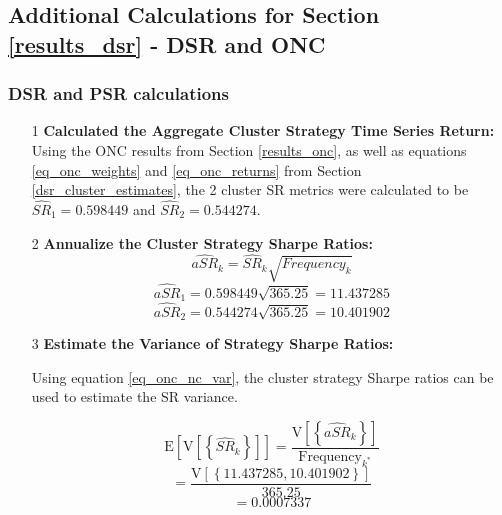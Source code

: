 \documentclass[a4paper,11pt,oneside]{article}
\theoremstyle{plain}
\theoremstyle{definition}
\begin{document}
	
	
	
	
	
	
	
	\subsection{Additional Calculations for Section \ref{results_dsr} - DSR and ONC}\label{results_dsr_appendix}
	
	
	\subsubsection{DSR and PSR calculations}
	
	\begin{itemize}
		\item [1] \textbf{Calculated the Aggregate Cluster Strategy Time Series Return:} \newline
		Using the ONC results from Section \ref{results_onc}, as well as equations \ref{eq_onc_weights} and \ref{eq_onc_returns} from Section \ref{dsr_cluster_estimates}, the 2 cluster SR metrics were calculated to be $\widehat{SR}_{1}={0.598449}$ and 	$\widehat{SR}_{2}={0.544274}$. \newline
		
		\item [2] \textbf{Annualize the Cluster Strategy Sharpe Ratios:} \newline
		\begin{equation}
		\widehat{aSR}_{k}=\widehat{SR}_{k}\sqrt{{Frequency_{k}}}
		\end{equation}
		\begin{equation}
		\widehat{aSR}_{1}={0.598449}\sqrt{{365.25}}={11.437285}
		\end{equation}
		\begin{equation}
		\widehat{aSR}_{2}={0.544274}\sqrt{{365.25}} ={10.401902}
		\end{equation}

		\item [3] \textbf{Estimate the Variance of Strategy Sharpe Ratios:} \newline

		Using equation \eqref{eq_onc_nc_var}, the cluster strategy Sharpe ratios can be used to estimate the SR variance. 
		
		\begin{equation}
		\mathrm{E}\left[\mathrm{V}\left[\left\{\widehat{S R}_{k}\right\}\right]\right]=\frac{\mathrm{V}\left[\left\{\widehat{aSR}_{k}\right\}\right]}{\text {Frequency}_{k^{*}}}
		\end{equation}
		\begin{equation}
		=\frac{\mathrm{V}\left[\left\{{11.437285,10.401902} \right\}\right]}{\text {365.25}}
		\end{equation}
		\begin{equation}
		={0.0007337}
		\end{equation}
		

\end{itemize}
\end{document}
